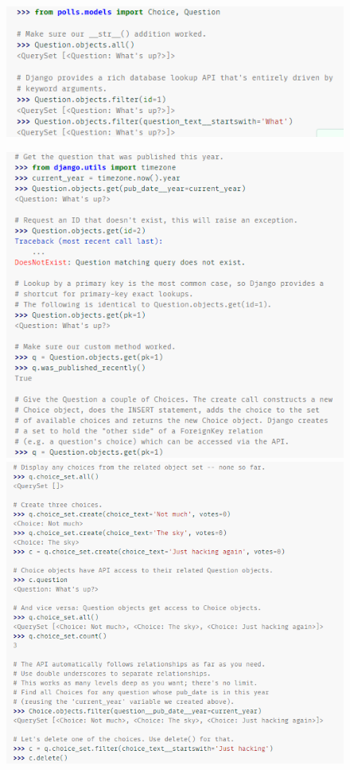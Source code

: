 \documentclass[10pt]{article}
\begin{document}
\begin{figure}[H]
\begin{center}
\includegraphics[scale=1]{figuras/3/32/324/img4.png}
\end{center}
\end{figure}
\begin{figure}[H]
\begin{center}
\includegraphics[scale=1]{figuras/3/32/324/img5.png}
\includegraphics[scale=0.9]{figuras/3/32/324/img6.png}
\end{center}
\end{figure}
\end{document}
